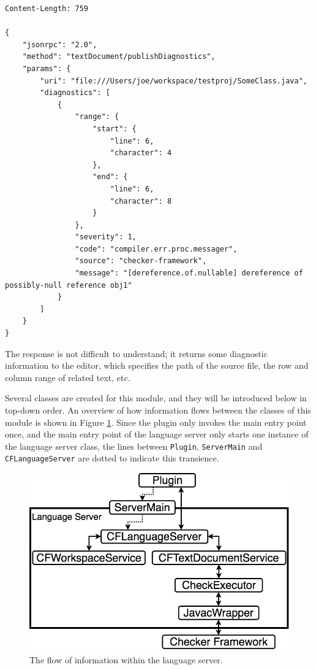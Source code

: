 \documentclass{article}
\begin{document}
\begin{lstlisting}
Content-Length: 759

{
    "jsonrpc": "2.0",
    "method": "textDocument/publishDiagnostics",
    "params": {
        "uri": "file:///Users/joe/workspace/testproj/SomeClass.java",
        "diagnostics": [
            {
                "range": {
                    "start": {
                        "line": 6,
                        "character": 4
                    },
                    "end": {
                        "line": 6,
                        "character": 8
                    }
                },
                "severity": 1,
                "code": "compiler.err.proc.messager",
                "source": "checker-framework",
                "message": "[dereference.of.nullable] dereference of possibly-null reference obj1"
            }
        ]
    }
}
\end{lstlisting}

The response is not difficult to understand; it returns some diagnostic information to the editor, which specifies the path of the source file, the row and column range of related text, etc.

Several classes are created for this module, and they will be introduced below in top-down order. An overview of how information flows between the classes of this module is shown in Figure \ref{fig:ls-modules}. Since the plugin only invokes the main entry point once, and the main entry point of the language server only starts one instance of the language server class, the lines between \verb|Plugin|, \verb|ServerMain| and \verb|CFLanguageServer| are dotted to indicate this transience.

\begin{figure}[ht]
\centering
\includegraphics[scale=0.35]{infoflow.png}
\caption{The flow of information within the language server.}
\label{fig:ls-modules}
\end{figure}
\end{document}
